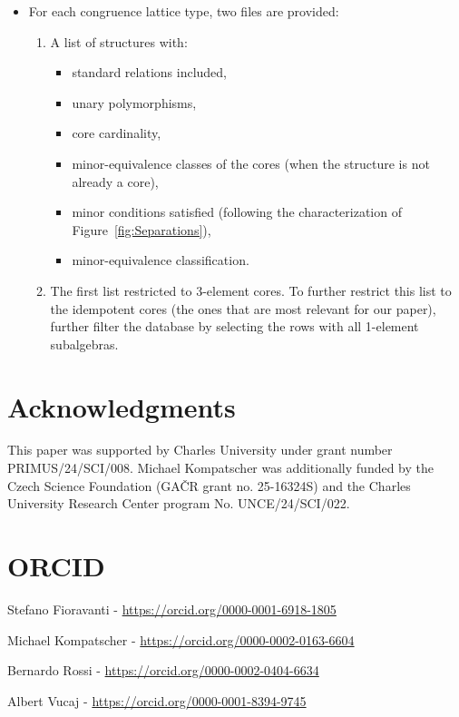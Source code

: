 \documentclass[12pt]{amsart}
\theoremstyle{definition}
\theoremstyle{definition}
\begin{document}
\begin{itemize}
    \item For each congruence lattice type, two files are provided:
    \begin{enumerate}
        \item A list of structures with:
        \begin{itemize}
            \item standard relations included,
            \item unary polymorphisms,
            \item core cardinality,
            \item minor-equivalence classes of the cores (when the structure is not already a core),
            \item minor conditions satisfied (following the characterization of Figure~\ref{fig:Separations}),
            \item minor-equivalence classification.
        \end{itemize}
        \item The first list restricted to 3-element cores. To further restrict this list to the idempotent cores (the ones that are most relevant for our paper), further filter the database by selecting the rows with all 1-element subalgebras. 
    \end{enumerate}
\end{itemize}


\section*{Acknowledgments}
This paper was supported by Charles University under grant number PRIMUS/24/SCI/008. Michael Kompatscher was additionally funded by the Czech Science Foundation (GA\v{C}R grant no. 25-16324S) and the Charles University Research Center program No. UNCE/24/SCI/022.

\section*{ORCID}
\noindent Stefano Fioravanti - \url{https://orcid.org/0000-0001-6918-1805}

\noindent Michael Kompatscher - \url{https://orcid.org/0000-0002-0163-6604}

\noindent Bernardo Rossi - \url{https://orcid.org/0000-0002-0404-6634}

\noindent Albert Vucaj - \url{https://orcid.org/0000-0001-8394-9745}




\end{document}
